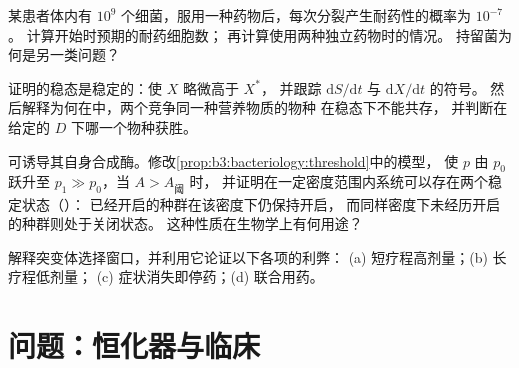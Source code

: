 \begin{exercise}[$\star\star$]\label{exo:b3:bacteriology:9}
某患者体内有 $10^{9}$ 个细菌，服用一种药物后，每次分裂产生耐药性的概率为 $10^{-7}$。
计算开始时预期的耐药细胞数；
再计算使用两种独立药物时的情况。
持留菌为何是另一类问题？
\end{exercise}

\begin{exercise}[$\star\star\star$]\label{exo:b3:bacteriology:10}
证明的稳态是稳定的：使 $X$ 略微高于 $X^{*}$，
并跟踪 $\mathrm{d}S/\mathrm{d}t$ 与 $\mathrm{d}X/\mathrm{d}t$ 的符号。
然后解释为何在中，两个竞争同一种营养物质的物种
在稳态下不能共存，
并判断在给定的 $D$ 下哪一个物种获胜。
\end{exercise}

\begin{exercise}[$\star\star\star$]\label{exo:b3:bacteriology:11}
可诱导其自身合成酶。修改\cref{prop:b3:bacteriology:threshold}中的模型，
使 $p$ 由 $p_{0}$ 跃升至 $p_{1} \gg p_{0}$，当 $A > A_{\text{阈}}$ 时，
并证明在一定密度范围内系统可以存在两个稳定状态（）：
已经开启的种群在该密度下仍保持开启，
而同样密度下未经历开启的种群则处于关闭状态。
这种性质在生物学上有何用途？
\end{exercise}

\begin{exercise}[$\star\star\star$]\label{exo:b3:bacteriology:12}
解释突变体选择窗口，并利用它论证以下各项的利弊：
(a) 短疗程高剂量；(b) 长疗程低剂量；
(c) 症状消失即停药；(d) 联合用药。
\end{exercise}

\section{问题：恒化器与临床}

